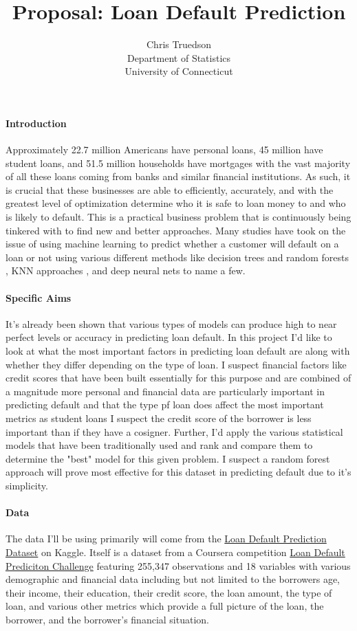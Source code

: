 \documentclass[12pt]{article}
\title{Proposal: Loan Default Prediction}
\author{Chris Truedson\\
  Department of Statistics\\
  University of Connecticut
}
\begin{document}
\maketitle


\paragraph{Introduction}
Approximately 22.7 million Americans have personal loans, 45 million have student loans, and 51.5 million households have mortgages with the vast majority of all these loans coming from banks and similar financial institutions. As such, it is crucial that these businesses are able to efficiently, accurately, and with the greatest level of optimization determine who it is safe to loan money to and who is likely to default. This is a practical business problem that is continuously being tinkered with to find new and better approaches. Many studies have took on the issue of using machine learning to predict whether a customer will default on a loan or not using various different methods like decision trees and random forests \cite{madaan2021loan}, KNN approaches \cite{lai2020loan}, and deep neural nets \cite{bayraci2019deep} to name a few.

\paragraph{Specific Aims}
It's already been shown that various types of models can produce high to near perfect levels or accuracy in predicting loan default. In this project I'd like to look at what the most important factors in predicting loan default are along with whether they differ depending on the type of loan. I suspect financial factors like credit scores that have been built essentially for this purpose and are combined of a magnitude more personal and financial data are particularly important in predicting default and that the type pf loan does affect the most important metrics as student loans I suspect the credit score of the borrower is less important than if they have a cosigner. Further, I'd apply the various statistical models that have been traditionally used and rank and compare them to determine the "best" model for this given problem. I suspect a random forest approach will prove most effective for this dataset in predicting default due to it's simplicity.

\paragraph{Data}
The data I'll be using primarily will come from the \href{https://www.kaggle.com/datasets/nikhil1e9/loan-default}{Loan Default Prediction Dataset} on Kaggle. Itself is a dataset from a Coursera competition \href{https://www.coursera.org/projects/data-science-coding-challenge-loan-default-prediction}{Loan Default Prediciton Challenge} featuring 255,347 observations and 18 variables with various demographic and financial data including but not limited to the borrowers age, their income, their education, their credit score, the loan amount, the type of loan, and various other metrics which provide a full picture of the loan, the borrower, and the borrower's financial situation.
\end{document}
